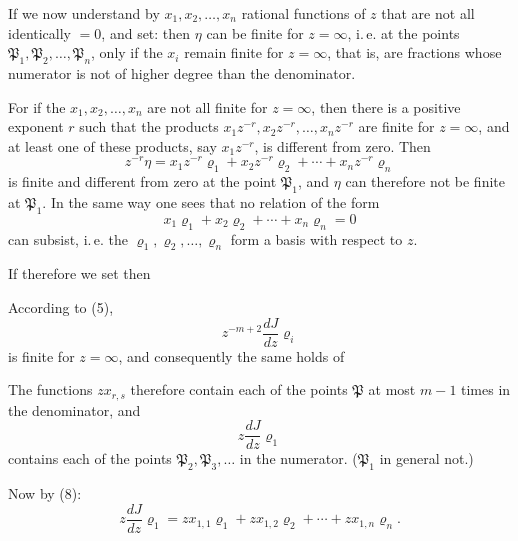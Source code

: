 If we now understand by $x_1, x_2, \ldots, x_n$ rational functions of $z$ that are not all identically $=0$, and set:
then $\eta$ can be finite for $z=\infty$, i.\,e. at the points $\mathfrak{P}_1, \mathfrak{P}_2, \ldots, \mathfrak{P}_n$, only if the $x_i$ remain finite for $z=\infty$, that is, are fractions whose numerator is not of higher degree than the denominator.

For if the $x_1, x_2, \ldots, x_n$ are not all finite for $z=\infty$, then there is a positive exponent $r$ such that the products $x_1z^{-r}, x_2z^{-r}, \ldots, x_nz^{-r}$ are finite for $z=\infty$, and at least one of these products, say $x_1z^{-r}$, is different from zero. Then
\[
z^{-r}\eta = x_1z^{-r}\varrho_1 + x_2z^{-r}\varrho_2 + \cdots + x_nz^{-r}\varrho_n
\]
is finite and different from zero at the point $\mathfrak{P}_1$, and $\eta$ can therefore not be finite at $\mathfrak{P}_1$. In the same way one sees that no relation of the form
\[
x_1\varrho_1 + x_2\varrho_2 + \cdots + x_n\varrho_n = 0
\]
can subsist, i.\,e. the $\varrho_1, \varrho_2, \ldots, \varrho_n$ form a basis with respect to $z$.

If therefore we set
then

According to (5),
\[
z^{-m+2}\frac{dJ}{dz}\varrho_i
\]
is finite for $z=\infty$, and consequently the same holds of

The functions $zx_{r,s}$ therefore contain each of the points $\mathfrak{P}$ at most $m-1$ times in the denominator, and
\[
z\frac{dJ}{dz}\varrho_1
\]
contains each of the points $\mathfrak{P}_2, \mathfrak{P}_3, \ldots$ in the numerator. ($\mathfrak{P}_1$ in general not.)

Now by (8):
\[
z\frac{dJ}{dz}\varrho_1 = zx_{1,1}\varrho_1 + zx_{1,2}\varrho_2 + \cdots + zx_{1,n}\varrho_n.
\]
